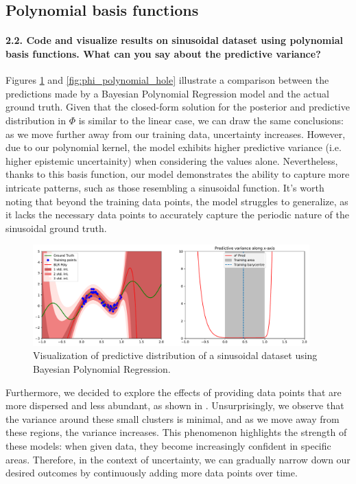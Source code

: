 \subsection{Polynomial basis functions}

\paragraph*{2.2. Code and visualize results on sinusoidal dataset using polynomial basis functions. What can you say about the predictive variance?}

Figures \ref{fig:phi_polynomial} and \ref{fig:phi_polynomial_hole} illustrate a comparison between the predictions made by a Bayesian Polynomial Regression model and the actual ground truth. Given that the closed-form solution for the posterior and predictive distribution in $\Phi$ is similar to the linear case, we can draw the same conclusions: as we move further away from our training data, uncertainty increases. However, due to our polynomial kernel, the model exhibits higher predictive variance (i.e. higher epistemic uncertainity) when considering the values alone. Nevertheless, thanks to this basis function, our model demonstrates the ability to capture more intricate patterns, such as those resembling a sinusoidal function. It's worth noting that beyond the training data points, the model struggles to generalize, as it lacks the necessary data points to accurately capture the periodic nature of the sinusoidal ground truth. %

\begin{figure}[H]
    \centering
    \includegraphics[width=0.95\textwidth]{phi_polynomial.pdf}
    \caption{Visualization of predictive distribution of a sinusoidal dataset using Bayesian Polynomial Regression.}
    \label{fig:phi_polynomial}
\end{figure}

Furthermore, we decided to explore the effects of providing data points that are more dispersed and less abundant, as shown in . Unsurprisingly, we observe that the variance around these small clusters is minimal, and as we move away from these regions, the variance increases. This phenomenon highlights the strength of these models: when given data, they become increasingly confident in specific areas. Therefore, in the context of uncertainty, we can gradually narrow down our desired outcomes by continuously adding more data points over time.

